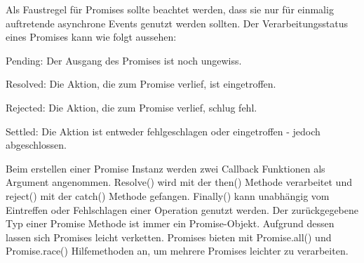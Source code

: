 \noindent
Als Faustregel für Promises sollte beachtet werden, dass sie nur für einmalig auftretende asynchrone Events genutzt werden sollten. Der Verarbeitungsstatus eines Promises kann wie folgt aussehen:

\begin{description} 
\item Pending: Der Ausgang des Promises ist noch ungewiss.
\item Resolved: Die Aktion, die zum Promise verlief, ist eingetroffen.
\item Rejected: Die Aktion, die zum Promise verlief, schlug fehl.
\item Settled: Die Aktion ist entweder fehlgeschlagen oder eingetroffen - jedoch abgeschlossen.
\end{description}

\noindent
Beim erstellen einer Promise Instanz werden zwei Callback Funktionen als Argument angenommen. Resolve() wird mit der then() Methode verarbeitet und reject() mit der catch() Methode gefangen. Finally() kann unabhängig vom Eintreffen oder Fehlschlagen einer Operation genutzt werden. Der zurückgegebene Typ einer Promise Methode ist immer ein Promise-Objekt. Aufgrund dessen lassen sich Promises leicht verketten. Promises bieten mit Promise.all() und Promise.race() Hilfemethoden an, um mehrere Promises leichter zu verarbeiten.




